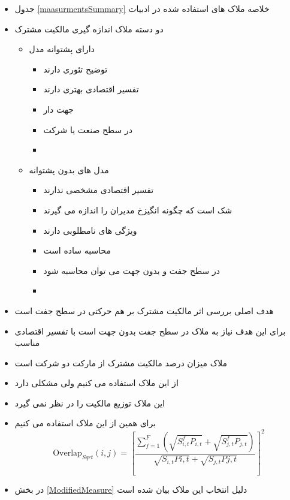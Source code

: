 \begin{itemize}
	\item 
	جدول 
	\ref{maasurmentsSummary}
	خلاصه ملاک های استفاده شده در ادبیات
	\item 
	دو دسته ملاک اندازه گیری مالکیت مشترک
	\begin{itemize}
		\item 
		دارای پشتوانه مدل
		\begin{itemize}
			\item 
			توضیح تئوری دارند
			\item 
			تفسیر اقتصادی بهتری دارند
			\item 
			جهت دار
			\item
			در سطح صنعت یا شرکت
			\item
		\end{itemize}
		\item 
		مدل های بدون پشتوانه
		\begin{itemize}
			\item 
			تفسیر اقتصادی مشخصی ندارند
			\item 
			شک است که چگونه انگیزخ مدیران را اندازه می گیرند
			\item 
			ویژگی های نامطلوبی دارند 
			\item
			محاسبه ساده است
			\item
			در سطح جفت و بدون جهت می توان محاسبه شود
			
			\item
		\end{itemize}
		
		
	\end{itemize}
	
	\item 
	هدف اصلی بررسی اثر مالکیت مشترک بر هم حرکتی در سطح جفت است
	
	\item 
	برای این هدف نیاز به ملاک در سطح جفت بدون جهت است با تفسیر اقتصادی مناسب
	
	\item 
	ملاک
	\cite{AntonPolk}
	میزان درصد مالکیت مشترک از مارکت دو شرکت است
	
	
	\item 
	از این ملاک استفاده می کنیم ولی مشکلی دارد
	\item 
	این ملاک توزیع مالکیت را در نظر نمی گیرد
	\item 
	برای همین از این ملاک استفاده می کنیم
	\begin{equation}
		\text{Overlap}_{Sqrt}(i, j) =  [\frac{\sum_{f =1}^{F}(\sqrt{S^f_{i,t}P_{i,t}}+\sqrt{S^f_{j,t}P_{j,t}})}{\sqrt{S_{i,t}P{i,t}} + \sqrt{S_{j,t}P{j,t}}}]^2 
		\label{sqrt0}
	\end{equation}
	\item
	در بخش 
	\ref{ModifiedMeasure}
	دلیل انتخاب این ملاک بیان شده است
\end{itemize}

